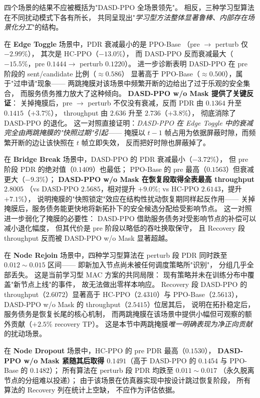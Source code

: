 四个场景的结果不应被概括为"DASD-PPO 全场景领先"。
相反，三种学习型算法在不同扰动模式下各有所长，
共同呈现出"\emph{学习型方法整体显著鲁棒、内部存在场景化分工}"的结构。

在 \textbf{Edge Toggle} 场景中，PDR 衰减最小的是 PPO-Base
（pre \(\rightarrow\) perturb 仅 \(-2.99\%\)），
其次是 HC-PPO（\(-13.0\%\)），
而 DASD-PPO 反而衰减最大（\(-15.5\%\)，pre \(0.1444\rightarrow\) perturb \(0.1220\)）。
进一步诊断表明 DASD-PPO 在 pre 阶段的 sent/candidate 比例（\(\approx 0.586\)）
显著高于 PPO-Base（\(\approx 0.500\)），属于"过申请"现象——
两跳掩膜对该场景中频繁开断的边给出了过于乐观的安全集合，
而服务债务推力放大了这种倾向。
\textbf{DASD-PPO w/o Mask 提供了关键反证}：
关掉掩膜后，pre \(\rightarrow\) perturb 不仅没有衰减，反而 PDR 由 \(0.1364\) 升至 \(\mathbf{0.1415}\)（\(+3.7\%\)），
throughput 由 \(2.636\) 升至 \(\mathbf{2.736}\)（\(+3.8\%\)），
彻底消除了 DASD-PPO 的退化。
这一对照直接证明：\emph{DASD-PPO 在 Edge Toggle 中的衰减完全由两跳掩膜的"快照过期"引起}——
掩膜以 \(t{-}1\) 帧占用为依据屏蔽时隙，而频繁开断的边让该快照在 \(t\) 帧立即失效，
反而把好时隙也屏蔽掉了。

在 \textbf{Bridge Break} 场景中，DASD-PPO 的 PDR 衰减最小（\(-3.72\%\)），
但 pre 阶段 PDR 的绝对值（\(0.1409\)）也最低；
PPO-Base 的 pre 最高（\(0.1563\)）但衰减更大（\(-9.3\%\)）；
\textbf{DASD-PPO w/o Mask 在恢复段取得全表最高 throughput \(\mathbf{2.8005}\)}
（vs DASD-PPO \(2.5685\)，相对提升 \(+9.0\%\); vs HC-PPO \(2.6143\)，提升 \(+7.1\%\)），
说明掩膜的"快照锁定"效应在结构性扰动恢复期同样起反作用——
关掉掩膜后，服务债务能更快地将新拓扑下的安全候选分配给受影响节点。
这一对照进一步弱化了掩膜的必要性：
DASD-PPO 借助服务债务对受影响节点的补偿可以减小退化幅度，
但其代价是 pre 阶段以略低的吞吐换取保守，
且 Recovery 段 throughput 反而被 DASD-PPO w/o Mask 显著超越。

在 \textbf{Node Rejoin} 场景中，四种学习型算法在 perturb 段
PDR 同时跌至 \(0.012\sim 0.015\) 区间——
即新加入节点尚未被任何调度策略所"识别"，
分组几乎全部丢失。
这是当前学习型 MAC 方案的共同局限：
现有策略并未在训练分布中覆盖"新节点上线"的事件，
故无法做出零样本响应。
Recovery 段 DASD-PPO 的 throughput（\(2.6072\)）显著高于
HC-PPO（\(2.4310\)）与 PPO-Base（\(2.5613\)），
DASD-PPO w/o Mask 的 throughput（\(2.5415\)）位居其后，
说明在拓扑稳定后，服务债务是恢复长尾的核心机制，
而两跳掩膜在该场景中提供小幅但可观察的额外贡献（\(+2.5\%\) recovery TP）。
这是本节中两跳掩膜\emph{唯一明确表现为净正向贡献}的扰动场景。

在 \textbf{Node Dropout} 场景中，HC-PPO 的 pre PDR 最高（\(0.1530\)），
\textbf{DASD-PPO w/o Mask 紧随其后取得 \(0.1491\)}（高于 DASD-PPO 的 \(0.1454\) 与 PPO-Base 的 \(0.1482\)）；
所有算法在 perturb 段 PDR 均跌至 \(0.011\sim 0.017\)
（永久脱离节点的分组难以投递）；
由于该场景在仿真器实现中按设计跳过恢复阶段，
所有算法的 Recovery 列在统计上空缺，
不应作为评估依据。

